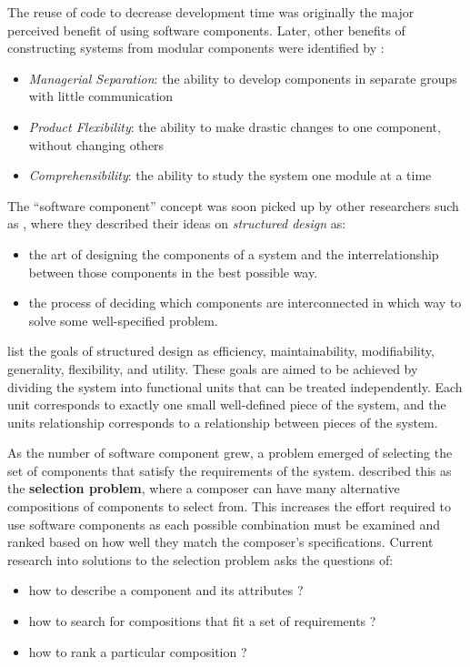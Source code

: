 The reuse of code to decrease development time was originally the major perceived benefit of using software components.
Later, other benefits of constructing systems from modular components were identified by \cite{Parnas1972}:
\begin{itemize}
  \item \textit{Managerial Separation}: the ability to develop components in separate groups with little communication
  \item \textit{Product Flexibility}: the ability to make drastic changes to one component, without changing others
  \item \textit{Comprehensibility}: the ability to study the system one module at a time
\end{itemize}

The ``software component'' concept was soon picked up by other researchers such as \cite{Yourdon1976}, where they described their ideas on \textit{structured design} as:
\begin{itemize}
  \item the art of designing the components of a system and the interrelationship between those components in the best possible way.
  \item the process of deciding which components are interconnected in which way to solve some well-specified problem.
\end{itemize}
\cite{Yourdon1976} list the goals of structured design as efficiency, maintainability, modifiability, generality, flexibility, and utility.
These goals are aimed to be achieved by dividing the system into functional units that can be treated independently.
Each unit corresponds to exactly one small well-defined piece of the system, and the units relationship corresponds to a relationship between pieces of the system.

As the number of software component grew, a problem emerged of selecting the set of components that satisfy the requirements of the system.
\cite{PrietoDiaz1987} described this as the \textbf{selection problem}, where a composer can have many alternative compositions of components to select from.
This increases the effort required to use software components as each possible combination must be examined and ranked based on how well they match the composer's specifications.
Current research into solutions to the selection problem asks the questions of:
\begin{itemize}
  \item how to describe a component and its attributes \citep{treinen2009common,Xinjuan2007}?
  \item how to search for compositions that fit a set of requirements \citep{abate2011,Kwong2010,Treinen2009,DeAlmeida2004}?
  \item how to rank a particular composition \citep{Chen2011,Aleti2009}?
\end{itemize}

